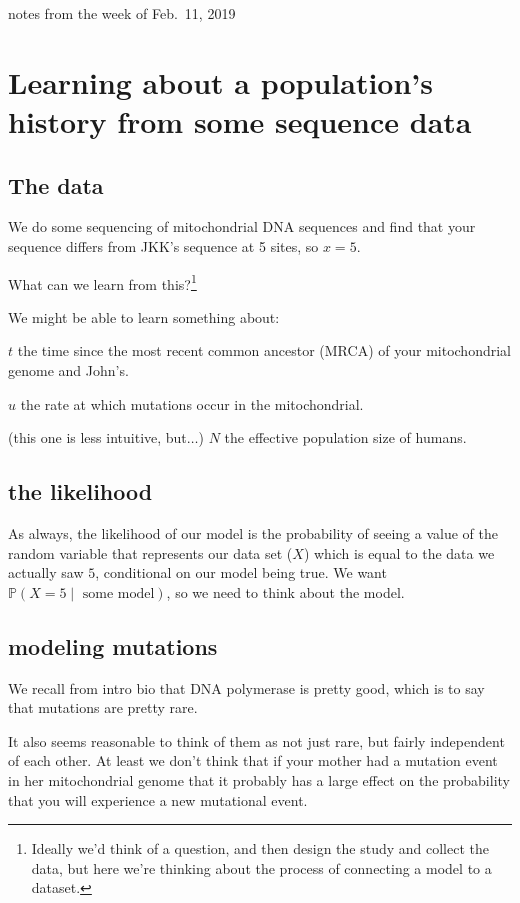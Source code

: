 \documentclass[11pt]{article}
\renewcommand{\Pr}{\mathbb{P}}
\begin{document}
notes from the week of Feb.~11, 2019 \\
\tableofcontents

\section{Learning about a population's history from some sequence data}

\subsection{The data}
We do some sequencing of mitochondrial DNA sequences and find that your sequence
differs from JKK's sequence at 5 sites, so $x=5$.

What can we learn from this?\footnote{Ideally we'd think of a question, and then
design the study and collect the data, but here we're thinking about the process
of connecting a model to a dataset.}

We might be able to learn something about:
\begin{compactitem}
    \item $t$ the time since the most recent common ancestor (MRCA)
of your mitochondrial genome and John's.
    \item  $u$ the rate at which mutations occur in the mitochondrial.
    \item (this one is less intuitive, but$\ldots$) $N$ the effective population
    size of humans.
\end{compactitem}

\subsection{the likelihood}
As always, the likelihood of our model is the probability of seeing a value of the
    random variable that represents our data set ($X$) which is equal to
    the data we actually saw $5$, conditional on our model being true.
We want $\Pr(X=5\mid\mbox{ some model})$, so we need to think about the model.

\subsection{modeling mutations}
We recall from intro bio that DNA polymerase is pretty good, which is to say 
that mutations are pretty rare.

It also seems reasonable to think of them as not just rare, but fairly independent of 
each other.
At least we don't think that if your mother had a mutation event in her mitochondrial 
   genome that it probably has a large effect on the probability that you will experience a new mutational event.
\end{document}
